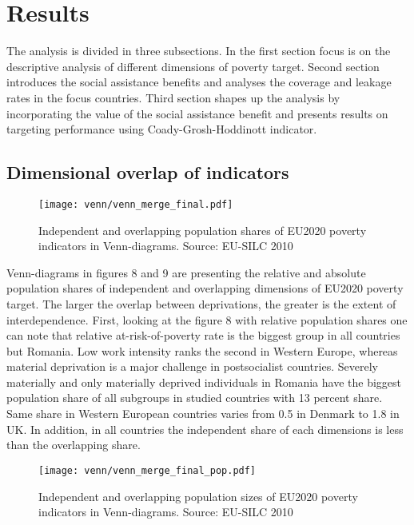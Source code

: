 \documentclass[11pt, a4paper]{article}\usepackage{graphicx, color}
\begin{document}
\section{Results}

The analysis is divided in three subsections. In the first section focus is on the descriptive analysis of different dimensions of poverty target. Second section introduces the social assistance benefits and analyses the coverage and leakage rates in the focus countries. Third section shapes up the analysis by incorporating the value of the social assistance benefit and presents results on targeting performance using Coady-Grosh-Hoddinott indicator.

\subsection{Dimensional overlap of indicators}




\begin{figure}[H]
  \centering
    \texttt{[image: venn/venn\_merge\_final.pdf]}
      \caption{Independent and overlapping population shares of EU2020 poverty indicators in Venn-diagrams. Source: EU-SILC 2010}
\end{figure}

Venn-diagrams in figures 8 and 9 are presenting the relative and absolute population shares of independent and overlapping dimensions of EU2020 poverty target. The larger the overlap between deprivations, the greater is the extent of interdependence. First, looking at the figure 8 with relative population shares one can note that relative at-risk-of-poverty rate is the biggest group in all countries but Romania. Low work intensity ranks the second in Western Europe, whereas material deprivation is a major challenge in postsocialist countries. Severely materially and only materially deprived individuals in Romania have the biggest population share of all subgroups in studied countries with 13 percent share. Same share in Western European countries varies from 0.5 in Denmark to 1.8 in UK. In addition, in all countries the independent share of each dimensions is less than the overlapping share.

\begin{figure}[H]
  \centering
    \texttt{[image: venn/venn\_merge\_final\_pop.pdf]}
      \caption{Independent and overlapping population sizes of EU2020 poverty indicators in Venn-diagrams. Source: EU-SILC 2010}
\end{figure}
\end{document}
